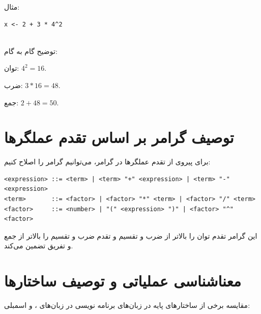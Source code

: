 \documentclass[11pt, a4paper, oneside]{book}
\newcounter{itemadded}
\let\LaTeXStandardEnumerateBegin\enumerate
\let\LaTeXStandardEnumerateEnd\endenumerate
\renewenvironment{enumerate}{%
	\LaTeXStandardEnumerateBegin%
	\setcounter{itemadded}{0}
}{%
	\LaTeXStandardEnumerateEnd%
}%
\begin{document}
			
			{\Large مثال:}
			
				\begin{latin}
					\begin{lstlisting}[caption={\lr{Precedence of operators}}] 
x <- 2 + 3 * 4^2
						
					\end{lstlisting}
				\end{latin}
				
				توضیح گام به گام:
				
				\begin{enumerate}
					
					\item 
					توان: $4^2 = 16$.
					
					\item 
					ضرب: $3 * 16 = 48$.
					
					\item
					جمع: $2 + 48 = 50$.
					
				\end{enumerate}
				
				
		\section{توصیف گرامر بر اساس تقدم عملگرها}
			
			برای پیروی از تقدم عملگرها در گرامر، می‌توانیم گرامر را اصلاح کنیم:
			
			\begin{latin}
				\begin{lstlisting}[caption={\lr{Operation grammar}}] 
<expression> ::= <term> | <term> "+" <expression> | <term> "-" <expression>
<term>       ::= <factor> | <factor> "*" <term> | <factor> "/" <term>
<factor>     ::= <number> | "(" <expression> ")" | <factor> "^" <factor>

				\end{lstlisting}
			\end{latin}
			
			این گرامر تقدم توان را بالاتر از ضرب و تقسیم و تقدم ضرب و تقسیم را بالاتر از جمع و تفریق تضمین می‌کند.
				
				
				
		\section{معناشناسی عملیاتی و توصیف ساختارها}
		
			مقایسه برخی از ساختارهای پایه در زبان‌های برنامه نویسی در زبان‌های ،  و اسمبلی:
			
\end{document}
